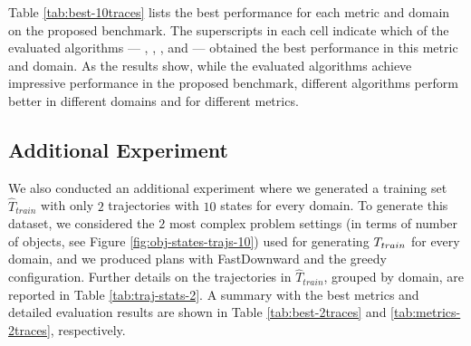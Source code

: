 
Table \ref{tab:best-10traces} lists the best performance for each metric and domain on the proposed benchmark. The superscripts in each cell indicate which of the evaluated algorithms --- \samshort{}, \offlam{}, \rosame, and \nolam{} --- obtained the best performance in this metric and domain. 
%
As the results show, while the evaluated algorithms achieve impressive performance in the proposed benchmark, different algorithms perform better in different domains and for different metrics. 




\subsection{Additional Experiment}
We also conducted an additional experiment where we generated a training set $\hat{T}_{train}$ with only $2$ trajectories with $10$ states for every domain. To generate this dataset, we considered the $2$ most complex problem settings (in terms of number of objects, see Figure \ref{fig:obj-states-trajs-10}) used for generating $T_{train}$ for every domain, and we produced plans with FastDownward and the greedy configuration. Further details on the trajectories in $\hat{T}_{train}$, grouped by domain, are reported in Table \ref{tab:traj-stats-2}. A summary with the best metrics and detailed evaluation results are shown in Table \ref{tab:best-2traces} and \ref{tab:metrics-2traces}, respectively.

